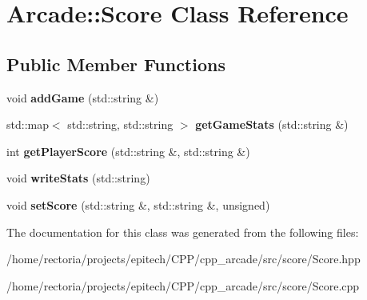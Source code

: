 \hypertarget{class_arcade_1_1_score}{}\section{Arcade\+:\+:Score Class Reference}
\label{class_arcade_1_1_score}
\subsection*{Public Member Functions}
\begin{DoxyCompactItemize}
\item 
\mbox{\label{class_arcade_1_1_score_a6eaa1ed7e5f60fecf96f90ad895aa68a}} 
void {\bfseries add\+Game} (std\+::string \&)
\item 
\mbox{\label{class_arcade_1_1_score_a7bad9a2617b4c2211d439f5716b94340}} 
std\+::map$<$ std\+::string, std\+::string $>$ {\bfseries get\+Game\+Stats} (std\+::string \&)
\item 
\mbox{\label{class_arcade_1_1_score_a9b952d8604c3b1c1bdbda082a27404ab}} 
int {\bfseries get\+Player\+Score} (std\+::string \&, std\+::string \&)
\item 
\mbox{\label{class_arcade_1_1_score_ad670e3bf5362c9a8e787b9f7b9ee5922}} 
void {\bfseries write\+Stats} (std\+::string)
\item 
\mbox{\label{class_arcade_1_1_score_a4588f8bac823b945849c29d42d728f01}} 
void {\bfseries set\+Score} (std\+::string \&, std\+::string \&, unsigned)
\end{DoxyCompactItemize}


The documentation for this class was generated from the following files\+:\begin{DoxyCompactItemize}
\item 
/home/rectoria/projects/epitech/\+C\+P\+P/cpp\+\_\+arcade/src/score/Score.\+hpp\item 
/home/rectoria/projects/epitech/\+C\+P\+P/cpp\+\_\+arcade/src/score/Score.\+cpp\end{DoxyCompactItemize}
